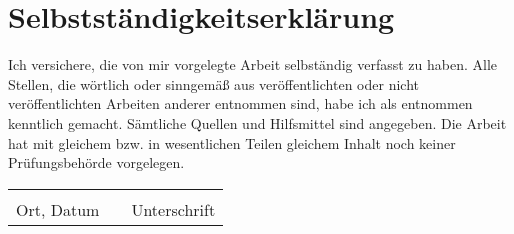\chapter{Selbstständigkeitserklärung}
Ich versichere, die von mir vorgelegte Arbeit selbständig verfasst zu haben. Alle
Stellen, die wörtlich oder sinngemäß aus veröffentlichten oder nicht veröffentlichten
Arbeiten anderer entnommen sind, habe ich als entnommen kenntlich gemacht.
Sämtliche Quellen und Hilfsmittel sind angegeben. Die Arbeit hat mit gleichem bzw.
in wesentlichen Teilen gleichem Inhalt noch keiner Prüfungsbehörde vorgelegen.

\vspace{2cm}

\begin{tabular}{lp{2em}l}
 \hspace{5cm}   && \hspace{4cm} \\\cline{1-1}\cline{3-3}
 Ort, Datum     && Unterschrift
\end{tabular} 

